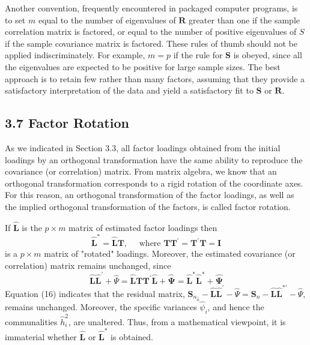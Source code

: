 \documentclass[12]{article}
\begin{document}
\noindent Another convention, frequently encountered in packaged computer programs, is to set $m$ equal to the number of eigenvalues of $\mathbf{R}$ greater than one if the sample correlation matrix is factored, or equal to the number of positive eigenvalues of $S$ if the sample covariance matrix is factored. These rules of thumb should not be applied indiscriminately. For example, $m=p$ if the rule for $\mathbf{S}$ is obeyed, since all the eigenvalues are expected to be positive for large sample sizes. The best approach is to retain few rather than many factors, assuming that they provide a satisfactory interpretation of the data and yield a satisfactory fit to $\mathbf{S}$ or $\mathbf{R}$.

\subsection*{3.7 Factor Rotation}

As we indicated in Section 3.3, all factor loadings obtained from the initial loadings by an orthogonal transformation have the same ability to reproduce the covariance (or correlation) matrix. From matrix algebra, we know that an orthogonal transformation corresponds to a rigid rotation of the coordinate axes. For this reason, an orthogonal transformation of the factor loadings, as well as the implied orthogonal transformation of the factors, is called factor rotation.

\noindent If $\hat{\mathbf{L}}$ is the $p \times m$ matrix of estimated factor loadings then
\begin{equation}
	\hat{\mathbf{L}}^*=\hat{\mathbf{L}} \mathbf{T}, \quad \text { where } \mathbf{T T}^{\prime}=\mathbf{T}^{\prime} \mathbf{T}=\mathbf{I}
\end{equation}
is a $p \times m$ matrix of "rotated" loadings. Moreover, the estimated covariance (or correlation) matrix remains unchanged, since
\begin{equation}
	\hat{\mathbf{L}} \hat{\mathbf{L}}^{\prime}+\hat{\Psi}=\hat{\mathbf{L}} \mathbf{T T}^{\prime} \hat{\mathbf{L}}+\hat{\boldsymbol{\Psi}}=\hat{\mathbf{L}}^* \hat{\mathbf{L}}^*+\hat{\boldsymbol{\Psi}}
\end{equation}
Equation (16) indicates that the residual matrix, $\mathbf{S}_{n_{\hat{n}}}-\hat{\mathbf{L}} \hat{\mathbf{L}}^{\prime}-\hat{\Psi}=\mathbf{S}_n-\hat{\mathbf{L}} \hat{\mathbf{L}}^{* \prime}-\hat{\Psi}$, remains unchanged. Moreover, the specific variances $\hat{\psi}_i$, and hence the communalities $\hat{h}_i^2$, are unaltered. Thus, from a mathematical viewpoint, it is immaterial whether $\hat{\mathbf{L}}$ or $\hat{\mathbf{L}}^*$ is obtained.
\end{document}
